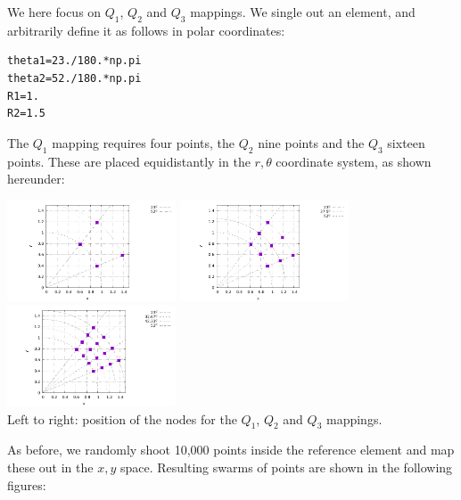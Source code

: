 We here focus on $Q_1$, $Q_2$ and $Q_3$ mappings. We single out an element, 
and arbitrarily define it as follows in polar coordinates:
\begin{lstlisting}
theta1=23./180.*np.pi
theta2=52./180.*np.pi
R1=1.
R2=1.5
\end{lstlisting}
The $Q_1$ mapping requires four points, the $Q_2$ nine points and the $Q_3$
sixteen points. These are placed equidistantly in the $r,\theta$ coordinate
system, as shown hereunder:

\begin{center}
\includegraphics[width=5cm]{images/mappings/curved/nodesQ1.pdf}
\includegraphics[width=5cm]{images/mappings/curved/nodesQ2.pdf}
\includegraphics[width=5cm]{images/mappings/curved/nodesQ3.pdf}\\
{\small Left to right: position of the nodes for the $Q_1$, $Q_2$ and $Q_3$ mappings.}
\end{center}

As before, we randomly shoot 10,000 points inside the reference element 
and map these out in the $x,y$ space. Resulting swarms of points are shown 
in the following figures:

